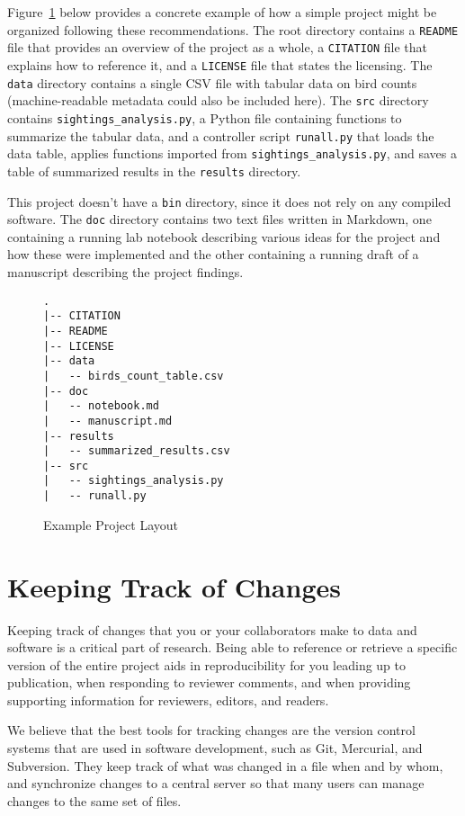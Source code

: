 \documentclass[10pt]{article}
\begin{document}
Figure~\ref{fig:layout} below provides a concrete example of how a
simple project might be organized following these recommendations. The
root directory contains a \texttt{README} file that provides an
overview of the project as a whole, a \texttt{CITATION} file that
explains how to reference it, and a \texttt{LICENSE} file that states the
licensing. The \texttt{data} directory contains a
single CSV file with tabular data on bird counts (machine-readable
metadata could also be included here). The \texttt{src} directory
contains \texttt{sightings\_analysis.py}, a Python file containing
functions to summarize the tabular data, and a controller script
\texttt{runall.py} that loads the data table, applies functions
imported from \texttt{sightings\_analysis.py}, and saves a table of
summarized results in the \texttt{results} directory.

This project doesn't have a \texttt{bin} directory, since it does not
rely on any compiled software. The \texttt{doc} directory contains two
text files written in Markdown, one containing a running lab notebook
describing various ideas for the project and how these were
implemented and the other containing a running draft of a manuscript
describing the project findings.

\begin{figure}
\begin{verbatim}
.
|-- CITATION
|-- README
|-- LICENSE
|-- data
|   -- birds_count_table.csv
|-- doc
|   -- notebook.md
|   -- manuscript.md
|-- results
|   -- summarized_results.csv
|-- src
|   -- sightings_analysis.py
|   -- runall.py
\end{verbatim}
\caption{Example Project Layout}
\label{fig:layout}
\end{figure}

\section{Keeping Track of Changes}\label{sec:versioning}

Keeping track of changes that you or your collaborators make to data
and software is a critical part of research. Being able to reference or
retrieve a specific version of the entire project aids in reproducibility
for you leading up to publication, when responding to reviewer comments,
and when providing supporting information for reviewers, editors,
and readers.

We believe that the best tools for tracking changes are the version
control systems that are used in software development, such as Git,
Mercurial, and Subversion. They keep track of what was changed in a
file when and by whom, and synchronize changes to a central server so
that many users can manage changes to the same set of files.
\end{document}

